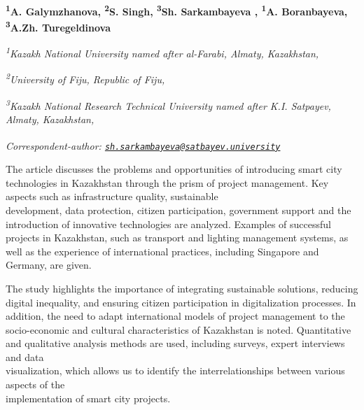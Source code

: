 
\begin{articleheader}

{\bfseries
\textsuperscript{1}A. Galymzhanova\authorid,
\textsuperscript{2}S. Singh\authorid,
\textsuperscript{3}Sh. Sarkambayeva\textsuperscript{\envelope } \authorid,
\textsuperscript{1}A. Boranbayeva\authorid,
\textsuperscript{3}A.Zh. Turegeldinova\authorid}
\end{articleheader}

\begin{affiliation}
\emph{\textsuperscript{1}Kazakh National University named after al-Farabi, Almaty, Kazakhstan,}

\emph{\textsuperscript{2}University of Fiju, Republic of Fiju,}

\emph{\textsuperscript{3}Kazakh National Research Technical University named after K.I. Satpayev, Almaty, Kazakhstan,}

\raggedright \textsuperscript{\envelope }{\em Correspondent-author: \href{mailto:sh.sarkambayeva@satbayev.university}{\nolinkurl{sh.sarkambayeva@satbayev.university}}}
\end{affiliation}

The article discusses the problems and opportunities of introducing
smart city technologies in Kazakhstan through the prism of project
management. Key aspects such as infrastructure quality, sustainable
\\development, data protection, citizen participation, government support
and the introduction of innovative technologies are analyzed. Examples
of successful projects in Kazakhstan, such as transport and lighting
management systems, as well as the experience of international
practices, including Singapore and Germany, are given.

The study highlights the importance of integrating sustainable
solutions, reducing digital inequality, and ensuring citizen
participation in digitalization processes. In addition, the need to
adapt international models of project management to the socio-economic
and cultural characteristics of Kazakhstan is noted. Quantitative and
qualitative analysis methods are used, including surveys, expert
interviews and data \\visualization, which allows us to identify the
interrelationships between various aspects of the \\implementation of
smart city projects.

